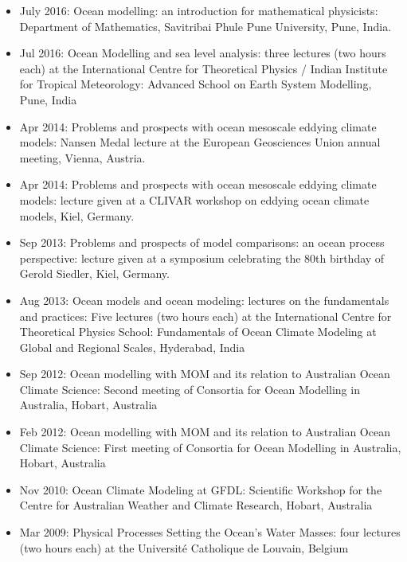 \begin{itemize}[leftmargin=*]
\item July 2016: {\sc Ocean modelling: an introduction for
    mathematical physicists}: Department of Mathematics, Savitribai
  Phule Pune University, Pune, India.

\item Jul 2016: {\sc Ocean Modelling and sea level analysis}: three lectures (two hours each) at the International Centre for Theoretical Physics / Indian Institute for Tropical Meteorology: {\sc Advanced School on Earth System Modelling}, Pune, India

\item Apr 2014: {\sc Problems and prospects with ocean mesoscale
    eddying climate models}: Nansen Medal lecture at the European
  Geosciences Union annual meeting, Vienna, Austria.

\item Apr 2014: {\sc Problems and prospects with ocean mesoscale
    eddying climate models}: lecture given at a CLIVAR workshop on
  eddying ocean climate models, Kiel, Germany.

\item Sep 2013: {\sc Problems and prospects of model comparisons: an
    ocean process perspective}: lecture given at a symposium
  celebrating the 80th birthday of Gerold Siedler, Kiel, Germany.


\item Aug 2013: {\sc Ocean models and ocean modeling: lectures on the fundamentals and practices}: Five lectures (two hours each) at the International Centre for Theoretical Physics School: {\sc Fundamentals of Ocean Climate Modeling at Global and Regional Scales}, Hyderabad, India

\item Sep 2012: {\sc Ocean modelling with MOM and its relation to
    Australian Ocean Climate Science}: Second meeting of Consortia for
  Ocean Modelling in Australia, Hobart, Australia

\item Feb 2012: {\sc Ocean modelling with MOM and its relation to
    Australian Ocean Climate Science}: First meeting of Consortia for
  Ocean Modelling in Australia, Hobart, Australia


\item Nov 2010:  {\sc Ocean Climate Modeling at GFDL}: Scientific
  Workshop for the Centre for Australian Weather and Climate Research,
  Hobart, Australia

\item Mar 2009: {\sc Physical Processes Setting the Ocean's Water Masses}: four lectures (two hours each) at the Universit\'e Catholique de Louvain, Belgium


\end{itemize}
